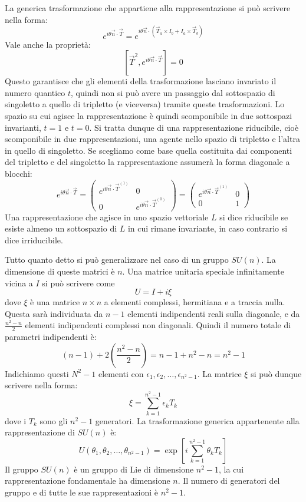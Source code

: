 La generica trasformazione che appartiene alla rappresentazione si può 
scrivere nella forma:
\[
e^{i\theta\vec{n}\cdot\vec{T}}=e^{i\theta\vec{n}\cdot(\vec{T}_a\times 
I_b+I_a\times\vec{T}_b)}
\]
Vale anche la proprietà:
\[
[\vec{T}^2,e^{i\theta\vec{n}\cdot\vec{T}}]=0
\]
Questo garantisce che gli elementi della trasformazione lasciano invariato il 
numero quantico $t$, quindi non si
può avere un passaggio dal sottospazio di singoletto a quello di tripletto (e 
viceversa) tramite queste
trasformazioni.
Lo spazio su cui agisce la rappresentazione è quindi scomponibile in due 
sottospazi invarianti, $t=1$ e $t=0$.
Si tratta dunque di una rappresentazione riducibile, cioè scomponibile in due 
rappresentazioni, una agente nello
spazio di tripletto e l'altra in quello di singoletto.
Se scegliamo come base quella costituita dai componenti del tripletto e del 
singoletto la rappresentazione
assumerà la forma diagonale a blocchi:
\[
e^{i\theta\vec{n}\cdot\vec{T}}=
\begin{pmatrix}
e^{i\theta\vec{n}\cdot\vec{T}^{(1)}} & 0\\
0 & e^{i\theta\vec{n}\cdot\vec{T}^{(0)}}
\end{pmatrix}
=
\begin{pmatrix}
e^{i\theta\vec{n}\cdot\vec{T}^{(1)}} & 0\\
0 & 1
\end{pmatrix}
\]
Una rappresentazione che agisce in uno spazio vettoriale $L$ si dice riducibile 
se esiste almeno un sottospazio di
$L$ in cui rimane invariante, in caso contrario si dice irriducibile.

Tutto quanto detto si può generalizzare nel caso di un gruppo $SU(n)$.
La dimensione di queste matrici è $n$. Una matrice unitaria speciale 
infinitamente vicina a $I$ si può scrivere come
\[
U=I+i\xi
\]
dove $\xi$ è una matrice $n\times n$ a elementi complessi, hermitiana e a 
traccia nulla. Questa sarà individuata da
$n-1$ elementi indipendenti reali sulla diagonale, e da $\frac{n^2-n}{2}$ 
elementi indipendenti complessi non
diagonali.
Quindi il numero totale di parametri indipendenti è:
\[
(n-1)+2(\frac{n^2-n}{2})=n-1+n^2-n=n^2-1
\]
Indichiamo questi $N^2-1$ elementi con 
$\epsilon_1,\epsilon_2,\dots,\epsilon_{n^2-1}$.
La matrice $\xi$ si può dunque scrivere nella forma:
\begin{equation}
\xi=\sum_{k=1}^{n^2-1}\epsilon_kT_k
\end{equation}
dove i $T_k$ sono gli $n^2-1$ generatori.
La trasformazione generica appartenente alla rappresentazione di $SU(n)$ è:
\begin{equation}
U(\theta_1,\theta_2,\dots,\theta_{n^2-1})=\exp[i\sum_{k=1}^{n^2-1}\theta_kT_k]
\end{equation}
Il gruppo $SU(n)$ è un gruppo di Lie di dimensione $n^2-1$, la cui 
rappresentazione fondamentale ha
dimensione $n$.
Il numero di generatori del gruppo e di tutte le sue rappresentazioni è 
$n^2-1$.

